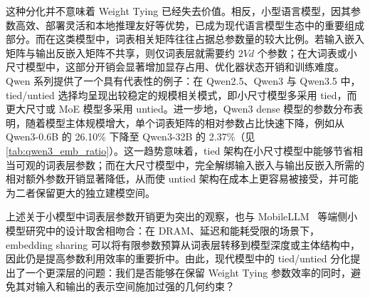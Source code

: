 \documentclass{article}
\theoremstyle{plain}
\theoremstyle{definition}
\theoremstyle{remark}
\begin{document}
这种分化并不意味着 Weight Tying 已经失去价值。相反，小型语言模型，因其参数高效、部署灵活和本地推理友好等优势，已成为现代语言模型生态中的重要组成部分。而在这类模型中，词表相关矩阵往往占据总参数量的较大比例。若输入嵌入矩阵与输出反嵌入矩阵不共享，则仅词表层就需要约 $2Vd$ 个参数；在大词表或小尺寸模型中，这部分开销会显著增加显存占用、优化器状态开销和训练难度。Qwen 系列提供了一个具有代表性的例子：在 Qwen2.5、Qwen3 与 Qwen3.5 中，tied/untied 选择均呈现出较稳定的规模相关模式，即小尺寸模型多采用 tied，而更大尺寸或 MoE 模型多采用 untied。进一步地，Qwen3 dense 模型的参数分布表明，随着模型主体规模增大，单个词表矩阵的相对参数占比快速下降，例如从 Qwen3-0.6B 的 26.10\% 下降至 Qwen3-32B 的 2.37\%（见 \cref{tab:qwen3_emb_ratio}）。这一趋势意味着，tied 架构在小尺寸模型中能够节省相当可观的词表层参数；而在大尺寸模型中，完全解绑输入嵌入与输出反嵌入所需的相对额外参数开销显著降低，从而使 untied 架构在成本上更容易被接受，并可能为二者保留更大的独立建模空间。

\begin{table}[!hb]
\centering
\caption{\textbf{Qwen3 dense 模型中单个 embedding 矩阵的参数占比} 单个 Emb 指 $V\times d$。对于 untied 模型，输入嵌入与输出反嵌入各有一份同规模矩阵，因此“实际词表矩阵总占比”为单个 Emb 占比的两倍}
\label{tab:qwen3_emb_ratio}
\begin{small}
\setlength{\tabcolsep}{3pt}
\end{small}
\vskip -0.1in
\end{table}

上述关于小模型中词表层参数开销更为突出的观察，也与 MobileLLM~\cite{liu2024mobilellm} 等端侧小模型研究中的设计取舍相吻合：在 DRAM、延迟和能耗受限的场景下，embedding sharing 可以将有限参数预算从词表层转移到模型深度或主体结构中，因此仍是提高参数利用效率的重要折中。由此，现代模型中的 tied/untied 分化提出了一个更深层的问题：我们是否能够在保留 Weight Tying 参数效率的同时，避免其对输入和输出的表示空间施加过强的几何约束？
\end{document}
